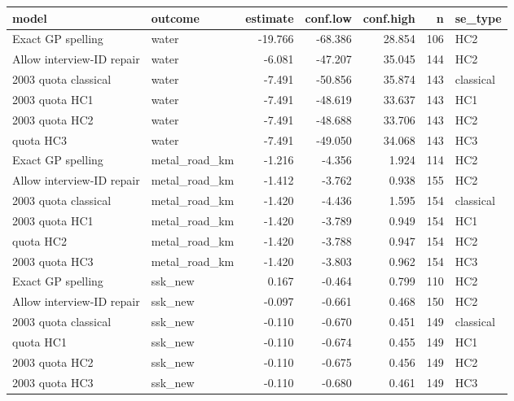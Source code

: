 
\begin{tabular}{llrrrrl}
\toprule
model & outcome & estimate & conf.low & conf.high & n & se\_type\\
\midrule
Exact GP spelling & water & -19.766 & -68.386 & 28.854 & 106 & HC2\\
Allow interview-ID repair & water & -6.081 & -47.207 & 35.045 & 144 & HC2\\
2003 quota classical & water & -7.491 & -50.856 & 35.874 & 143 & classical\\
2003 quota HC1 & water & -7.491 & -48.619 & 33.637 & 143 & HC1\\
2003 quota HC2 & water & -7.491 & -48.688 & 33.706 & 143 & HC2\\
\addlinespace
2003 quota HC3 & water & -7.491 & -49.050 & 34.068 & 143 & HC3\\
Exact GP spelling & metal\_road\_km & -1.216 & -4.356 & 1.924 & 114 & HC2\\
Allow interview-ID repair & metal\_road\_km & -1.412 & -3.762 & 0.938 & 155 & HC2\\
2003 quota classical & metal\_road\_km & -1.420 & -4.436 & 1.595 & 154 & classical\\
2003 quota HC1 & metal\_road\_km & -1.420 & -3.789 & 0.949 & 154 & HC1\\
\addlinespace
2003 quota HC2 & metal\_road\_km & -1.420 & -3.788 & 0.947 & 154 & HC2\\
2003 quota HC3 & metal\_road\_km & -1.420 & -3.803 & 0.962 & 154 & HC3\\
Exact GP spelling & ssk\_new & 0.167 & -0.464 & 0.799 & 110 & HC2\\
Allow interview-ID repair & ssk\_new & -0.097 & -0.661 & 0.468 & 150 & HC2\\
2003 quota classical & ssk\_new & -0.110 & -0.670 & 0.451 & 149 & classical\\
\addlinespace
2003 quota HC1 & ssk\_new & -0.110 & -0.674 & 0.455 & 149 & HC1\\
2003 quota HC2 & ssk\_new & -0.110 & -0.675 & 0.456 & 149 & HC2\\
2003 quota HC3 & ssk\_new & -0.110 & -0.680 & 0.461 & 149 & HC3\\
\bottomrule
\end{tabular}
